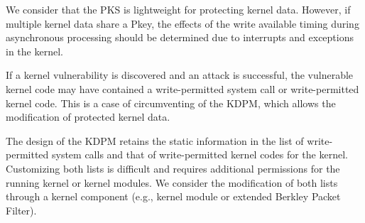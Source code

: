 We consider that the PKS is lightweight for protecting kernel data.
%
However, if multiple kernel data share a Pkey, 
the effects of the write available timing during asynchronous processing should
be determined due to interrupts and exceptions in the kernel. 
% 


If a kernel vulnerability is discovered and an attack is successful, the
vulnerable kernel code may have contained a write-permitted system call or
write-permitted kernel code. This is a case of circumventing of the KDPM, which
allows the modification of protected kernel data.

The design of the KDPM retains the static information in the list of write-permitted system
calls and that of write-permitted kernel codes for the kernel. %
Customizing both lists is difficult and requires additional permissions for the
running kernel or kernel modules. We consider the modification of both lists
through a kernel component (e.g., kernel module or extended Berkley Packet
Filter). 

 





